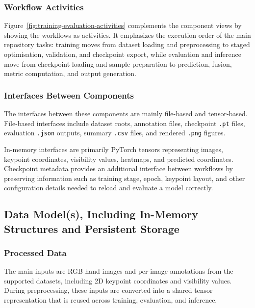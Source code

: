 ﻿\documentclass[11pt,a4paper]{article}
\begin{document}
\subsubsection*{Workflow Activities}

Figure~\ref{fig:training-evaluation-activities} complements the component
views by showing the workflows as activities.
It emphasizes the execution order of the main repository tasks: training moves
from dataset loading and preprocessing to staged optimisation, validation, and
checkpoint export, while evaluation and inference move from checkpoint loading
and sample preparation to prediction, fusion, metric computation, and output
generation.

\subsubsection*{Interfaces Between Components}

The interfaces between these components are mainly file-based and tensor-based.
File-based interfaces include dataset roots, annotation files, checkpoint
\texttt{.pt} files, evaluation \texttt{.json} outputs, summary \texttt{.csv}
files, and rendered \texttt{.png} figures.

\medskip

In-memory interfaces are primarily PyTorch tensors representing images,
keypoint coordinates, visibility values, heatmaps, and predicted coordinates.
Checkpoint metadata provides an additional interface between workflows by
preserving information such as training stage, epoch, keypoint layout, and
other configuration details needed to reload and evaluate a model correctly.

\subsection{Data Model(s), Including In-Memory Structures and Persistent Storage}

\subsubsection*{Processed Data}

The main inputs are RGB hand images and per-image
annotations from the supported datasets, including 2D keypoint coordinates and
visibility values. During preprocessing, these inputs are converted into a
shared tensor representation that is reused across training, evaluation, and
inference.
\end{document}
